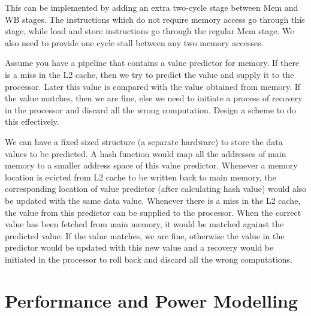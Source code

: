 \begin{ExerciseList}
\Answer
This can be implemented by adding an extra two-cycle stage between Mem and WB stages. The instructions which do not require memory
access go through this stage, while load and store instructions go through the regular Mem stage. We also need to provide one cycle
stall between any two memory accesses.

\Exercise[difficulty=2]
Assume you have a pipeline that contains a value predictor for memory. If there is a miss in the L2
cache, then we try to predict the value and supply it to the processor. Later this value is compared
with the value obtained from memory. If the value matches, then we are fine, else we need to initiate a
process of recovery in the processor and discard all the wrong computation. Design a scheme to do this
effectively.

\Answer
We can have a fixed sized structure (a separate hardware) to store the data
values to be predicted. A hash function would map all the addresses of main
memory to a smaller address space of this value predictor. Whenever a memory
location is evicted from L2 cache to be
written back to main memory, the corresponding location of value predictor
(after calculating hash value) would also be updated with the same data value.
Whenever there is a miss in the L2 cache, the value from this predictor can be
supplied to the processor. When
the correct value has been fetched from main memory, it would be matched
against the predicted value. If the value matches, we are fine, otherwise the
value in the predictor would be updated with this new value and a recovery
would be initiated in the processor to
roll back and discard all the wrong computations.


\end{ExerciseList}

\section*{Performance and Power Modelling}


